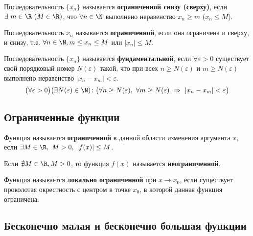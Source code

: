 \begin{definition}
  Последовательность $\{x_{n}\} $ называется \textbf{ограниченной снизу (сверху)}, если $\exists\ m \in \R\ (M \in \R)$, что $\forall n \in \N$ выполнено неравенство $x_{n} \ge m$ ($x_{n} \le M$).
\end{definition}

\begin{definition}
  Последовательность $x_{n}$ называется \textbf{ограниченной}, если она ограничена и сверху, и снизу, т.е. $\forall n \in \N, m \le x_{n} \le M$ или $|x_{n}| \le M$.
\end{definition}

\begin{definition}
  Последовательность $\{x_{n}\} $ называется \textbf{фундаментальной}, если $\forall \varepsilon > 0$ существует свой порядковый номер $N(\varepsilon)$ такой, что при всех $n \ge N(\varepsilon)$ и $m \ge  N(\varepsilon)$ выполнено неравенство $|x_{n} - x_{m}| < \varepsilon$.
  \[
    \big(\forall \varepsilon > 0\big)\big(\exists N(\varepsilon) \in \N)\colon\big(\forall n \ge N(\varepsilon),\ \forall m \ge N(\varepsilon)\ \Rightarrow\ |x_{n} - x_{m}| < \varepsilon\big)
  \]
\end{definition}

\subsection{Ограниченные функции}

\begin{definition}
  Функция называется \textbf{ограниченной} в данной области изменения аргумента $x$, если $\exists M\in \R,\ M > 0,\ |f(x)| \le M$.
\end{definition}

\begin{definition}
  Если $\nexists M \in \R, M > 0$, то функция $f(x)$ называется \textbf{неограниченной}.
\end{definition}

\begin{definition}
  Функция называется \textbf{локально ограниченной} при $x \to x_0$, если существует проколотая окрестность с центром в точке $x_0$, в которой данная функция ограничена.
\end{definition}

\subsection{Бесконечно малая и бесконечно большая функции}

